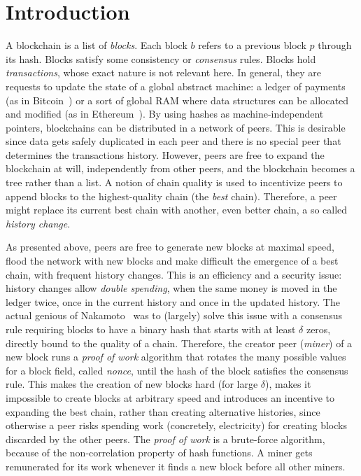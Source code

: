 \section{Introduction}\label{sec:introduction}

A blockchain is a list of \emph{blocks}.
Each block $b$ refers to a previous block $p$ through its hash.
Blocks satisfy some consistency or \emph{consensus} rules.
Blocks hold \emph{transactions}, whose exact nature is not relevant here.
In general, they are requests to update the state of a global abstract machine:
a ledger of payments (as in Bitcoin~\cite{Nakamoto08,Antonopoulos17})
or a sort of global RAM where data structures can be allocated and modified
(as in Ethereum~\cite{AntonopoulosW18}).
By using hashes as machine-independent
pointers, blockchains can be distributed in a network of peers.
This is desirable since data gets safely duplicated
in each peer and there is no special peer that determines the
transactions history.
However, peers are free to expand the blockchain at will, independently from other
peers, and the blockchain becomes a tree rather than a list.
A notion of chain quality is used to incentivize peers to append blocks to the highest-quality chain
(the \emph{best} chain).
Therefore, a peer might replace its current best chain with another, even better chain,
a so called \emph{history change}.

As presented above, peers are free to generate new blocks at maximal speed, flood the network
with new blocks and make difficult the emergence of a best chain, with frequent history changes.
This is an efficiency and a security issue: history changes allow
\emph{double spending}, when the same money is moved in the ledger twice, once in the current history
and once in the updated history. The actual genious of Nakamoto~\cite{Nakamoto08} was to
(largely) solve this issue with a consensus rule requiring blocks to have a binary hash
that starts with at least $\delta$ zeros, directly bound to the quality of a chain.
Therefore, the creator peer (\emph{miner}) of a new block runs a \emph{proof of work} algorithm
that rotates the many possible values for a block field, called \emph{nonce}, until
the hash of the block satisfies the consensus rule. This makes the creation of new blocks hard
(for large $\delta$), makes it impossible to create blocks at arbitrary speed and introduces an
incentive to expanding the best chain, rather than creating alternative histories, since
otherwise a peer
risks spending work (concretely, electricity) for creating blocks discarded
by the other peers. The \emph{proof of work} is a brute-force algorithm,
because of the non-correlation property of hash functions.
A miner gets remunerated for its work whenever it finds a new block before all other miners.


